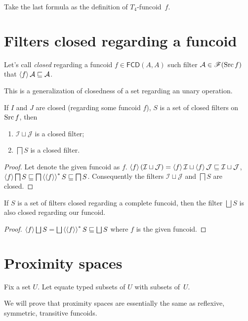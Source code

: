 Take the last formula as the definition of $T_4$-funcoid~$f$.

\section{Filters closed regarding a funcoid}
\begin{defn}
Let's call \emph{closed} regarding a funcoid
$f\in\mathsf{FCD}(A,A)$ such filter $\mathcal{A}\in\mathscr{F}(\operatorname{Src} f)$
that $\left\langle f\right\rangle\mathcal{A}\sqsubseteq\mathcal{A}$.
\end{defn}
This is a generalization of closedness of a set regarding an unary
operation.
\begin{prop}
If $I$ and $J$ are closed (regarding some funcoid $f$), $S$ is
a set of closed filters on $\operatorname{Src} f$, then
\begin{enumerate}
\item $\mathcal{I}\sqcup\mathcal{J}$ is a closed filter;
\item $\bigsqcap S$ is a closed filter.
\end{enumerate}
\end{prop}
\begin{proof}
Let denote the given funcoid as $f$. $\left\langle f\right\rangle(\mathcal{I}\sqcup\mathcal{J})=\left\langle f\right\rangle\mathcal{I}\sqcup\left\langle f\right\rangle\mathcal{J}\sqsubseteq\mathcal{I}\sqcup\mathcal{J}$,
$\left\langle f\right\rangle\bigsqcap S\sqsubseteq\bigsqcap\left\langle \left\langle f\right\rangle\right\rangle ^{\ast}S\sqsubseteq\bigsqcap S$.
Consequently the filters $\mathcal{I}\sqcup\mathcal{J}$ and $\bigsqcap S$
are closed.\end{proof}
\begin{prop}
If $S$ is a set of filters closed regarding a complete funcoid, then
the filter $\bigsqcup S$ is also closed regarding our funcoid.\end{prop}
\begin{proof}
$\supfun f\bigsqcup S=\bigsqcup\rsupfun{\supfun f}S\sqsubseteq\bigsqcup S$
where $f$ is the given funcoid.
\end{proof}

\section{Proximity spaces}

Fix a set $U$. Let equate typed subsets of $U$ with subsets of~$U$.

We will prove that proximity spaces are essentially the same as reflexive,
symmetric, transitive funcoids.

